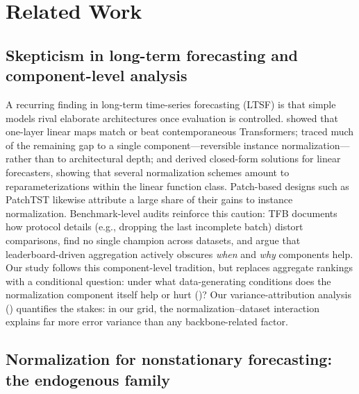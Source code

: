 \section{Related Work}\label{sec:related}

\subsection{Skepticism in long-term forecasting and component-level analysis}

A recurring finding in long-term time-series forecasting (LTSF) is that simple models rival elaborate architectures once evaluation is controlled. \citet{zeng2023dlinear} showed that one-layer linear maps match or beat contemporaneous Transformers; \citet{li2023rlinear} traced much of the remaining gap to a single component---reversible instance normalization---rather than to architectural depth; and \citet{toner2024linear} derived closed-form solutions for linear forecasters, showing that several normalization schemes amount to reparameterizations within the linear function class. Patch-based designs such as PatchTST \citep{nie2023patchtst} likewise attribute a large share of their gains to instance normalization. Benchmark-level audits reinforce this caution: TFB \citep{qiu2024tfb} documents how protocol details (e.g., dropping the last incomplete batch) distort comparisons, \citet{brigato2026champions} find no single champion across datasets, and \citet{position2025benchmark} argue that leaderboard-driven aggregation actively obscures \emph{when} and \emph{why} components help. Our study follows this component-level tradition, but replaces aggregate rankings with a conditional question: under what data-generating conditions does the normalization component itself help or hurt ()? Our variance-attribution analysis () quantifies the stakes: in our grid, the normalization--dataset interaction explains far more error variance than any backbone-related factor.

\subsection{Normalization for nonstationary forecasting: the endogenous family}

